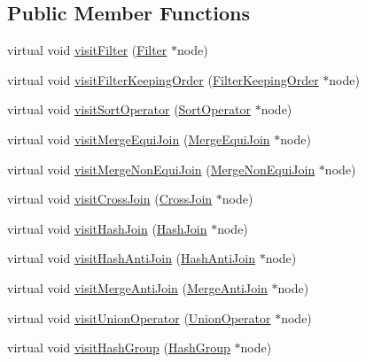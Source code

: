 \subsection*{Public Member Functions}
\begin{DoxyCompactItemize}
\item 
virtual void \hyperlink{class_physical_operator_visitor_a30731ff26547314b268e1166f10e57ee}{visit\+Filter} (\hyperlink{class_filter}{Filter} $\ast$node)
\item 
virtual void \hyperlink{class_physical_operator_visitor_a87aa256f7633364ab8fea61a4a20dd19}{visit\+Filter\+Keeping\+Order} (\hyperlink{class_filter_keeping_order}{Filter\+Keeping\+Order} $\ast$node)
\item 
virtual void \hyperlink{class_physical_operator_visitor_ae5f81c64ca3acfa04737fc6655d72767}{visit\+Sort\+Operator} (\hyperlink{class_sort_operator}{Sort\+Operator} $\ast$node)
\item 
virtual void \hyperlink{class_physical_operator_visitor_a4a90fb4cad8fe3ab4877f6ee6f43e1e5}{visit\+Merge\+Equi\+Join} (\hyperlink{class_merge_equi_join}{Merge\+Equi\+Join} $\ast$node)
\item 
virtual void \hyperlink{class_physical_operator_visitor_a9f8bd69369f2fff2bbc74b7aadceaab5}{visit\+Merge\+Non\+Equi\+Join} (\hyperlink{class_merge_non_equi_join}{Merge\+Non\+Equi\+Join} $\ast$node)
\item 
virtual void \hyperlink{class_physical_operator_visitor_a897e543962a692f2725ff7742efae056}{visit\+Cross\+Join} (\hyperlink{class_cross_join}{Cross\+Join} $\ast$node)
\item 
virtual void \hyperlink{class_physical_operator_visitor_aedb5da87c0637ad8097b7c2eb129129e}{visit\+Hash\+Join} (\hyperlink{class_hash_join}{Hash\+Join} $\ast$node)
\item 
virtual void \hyperlink{class_physical_operator_visitor_af1ce499e2c6db52ed03c3e5f57d144d3}{visit\+Hash\+Anti\+Join} (\hyperlink{class_hash_anti_join}{Hash\+Anti\+Join} $\ast$node)
\item 
virtual void \hyperlink{class_physical_operator_visitor_a3d44b3e23abc47c8c0c56938c12ed98a}{visit\+Merge\+Anti\+Join} (\hyperlink{class_merge_anti_join}{Merge\+Anti\+Join} $\ast$node)
\item 
virtual void \hyperlink{class_physical_operator_visitor_adbb3e6618904bc7e6d0b6aa3958132e9}{visit\+Union\+Operator} (\hyperlink{class_union_operator}{Union\+Operator} $\ast$node)
\item 
virtual void \hyperlink{class_physical_operator_visitor_aa5591d034ce34887c813affc48b7a19c}{visit\+Hash\+Group} (\hyperlink{class_hash_group}{Hash\+Group} $\ast$node)

\end{DoxyCompactItemize}
